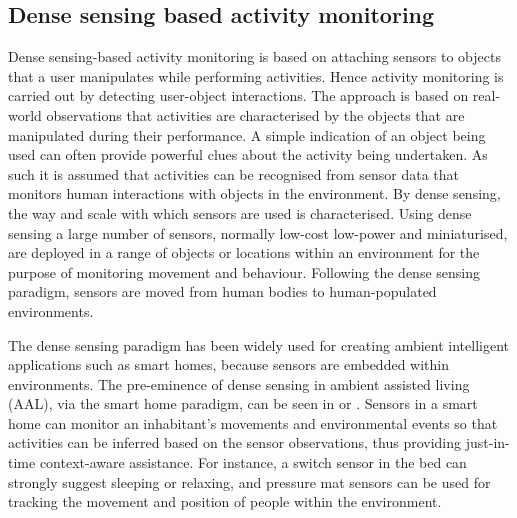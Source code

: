 \subsection{Dense sensing based activity monitoring}

Dense sensing-based activity monitoring is based on attaching sensors to objects that a user manipulates while performing activities. Hence activity monitoring is carried out by detecting user-object interactions. The approach is based on real-world observations that activities are characterised by the objects that are manipulated during their performance. A simple indication of an object being used can often provide powerful clues about the activity being undertaken. As such it is assumed that activities can be recognised from sensor data that monitors human interactions with objects in the environment. By dense sensing, the way and scale with which sensors are used is characterised. Using dense sensing a large number of sensors, normally low-cost low-power and miniaturised, are deployed in a range of objects or locations within an environment for the purpose of monitoring movement and behaviour. Following the dense sensing paradigm, sensors are moved from human bodies to human-populated environments.

The dense sensing paradigm has been widely used for creating ambient intelligent applications such as smart homes, because sensors are embedded within environments. The pre-eminence of dense sensing in ambient assisted living (AAL), via the smart home paradigm, can be seen in \cite{Chan2008} \cite{Nugent2009} or \cite{Helal2005}. Sensors in a smart home can monitor an inhabitant’s movements and environmental events so that activities can be inferred based on the sensor observations, thus providing just-in-time context-aware assistance. For instance, a switch sensor in the bed can strongly suggest sleeping or relaxing, and pressure mat sensors can be used for tracking the movement and position of people within the environment.

